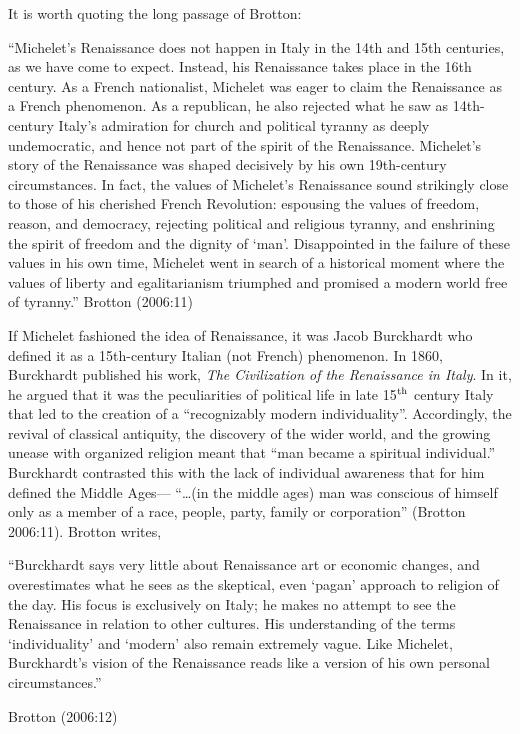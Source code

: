 It is worth quoting the long passage of Brotton: 
\begin{myquote} 
“Michelet’s Renaissance does not happen in Italy in the 14th and 15th centuries, as we have come to expect. Instead, his Renaissance takes place in the 16th century. As a French nationalist, Michelet was eager to claim the Renaissance as a French phenomenon. As a republican, he also rejected what he saw as 14th-century Italy’s admiration for church and political tyranny as deeply undemocratic, and hence not part of the spirit of the Renaissance. Michelet’s story of the Renaissance was shaped decisively by his own 19th-century circumstances. In fact, the values of Michelet’s Renaissance sound strikingly close to those of his cherished French Revolution: espousing the values of freedom, reason, and democracy, rejecting political and religious tyranny, and enshrining the spirit of freedom and the dignity of ‘man’. Disappointed in the failure of these values in his own time, Michelet went in search of a historical moment where the values of liberty and egalitarianism triumphed and promised a modern world free of tyranny.”	\hfill{Brotton (2006:11)}
\end{myquote}

If Michelet fashioned the idea of Renaissance, it was Jacob Burckhardt who defined it as a 15th-century Italian (not French) phenomenon. In 1860, Burckhardt published his work, {\sl The Civilization of the Renaissance in Italy}. In it, he argued that it was the peculiarities of political life in late 15$^{\rm th}$ century Italy that led to the creation of a “recognizably modern individuality”. Accordingly, the revival of classical antiquity, the discovery of the wider world, and the growing unease with organized religion meant that “man became a spiritual individual.” Burckhardt contrasted this with the lack of individual awareness that for him defined the Middle Ages—  “…(in the middle ages) man was conscious of himself only as a member of a race, people, party, family or corporation” (Brotton 2006:11). Brotton writes,
\begin{myquote}
“Burckhardt says very little about Renaissance art or economic changes, and overestimates what he sees as the skeptical, even ‘pagan’ approach to religion of the day. His focus is exclusively on Italy; he makes no attempt to see the Renaissance in relation to other cultures. His understanding of the terms ‘individuality’ and ‘modern’ also remain extremely vague. Like Michelet, Burckhardt’s vision of the Renaissance reads like a version of his own personal circumstances.”  

\hfill{Brotton (2006:12)}
\end{myquote}

